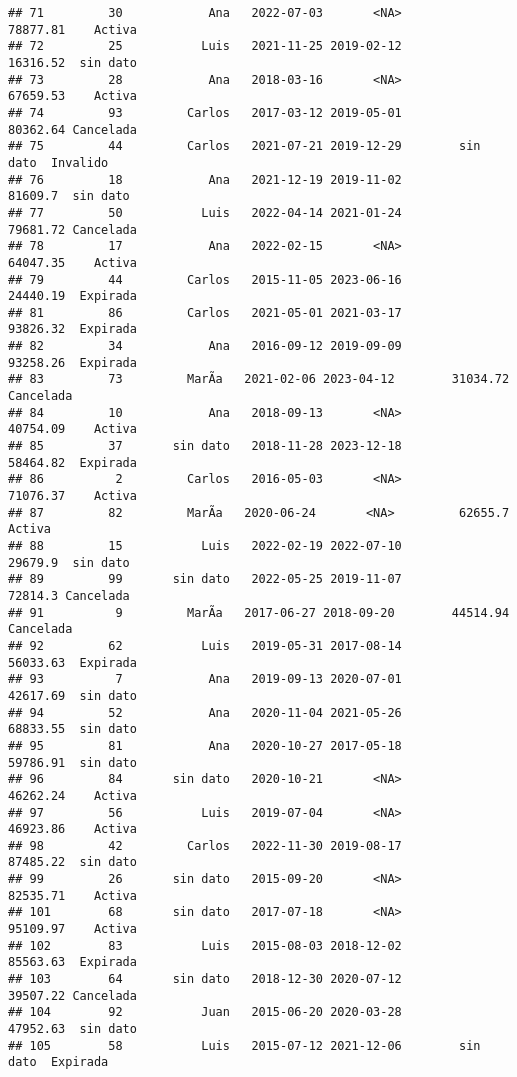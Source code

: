 \documentclass[
]{article}
\begin{document}
\begin{verbatim}
## 71         30            Ana   2022-07-03       <NA>        78877.81    Activa
## 72         25           Luis   2021-11-25 2019-02-12        16316.52  sin dato
## 73         28            Ana   2018-03-16       <NA>        67659.53    Activa
## 74         93         Carlos   2017-03-12 2019-05-01        80362.64 Cancelada
## 75         44         Carlos   2021-07-21 2019-12-29        sin dato  Invalido
## 76         18            Ana   2021-12-19 2019-11-02         81609.7  sin dato
## 77         50           Luis   2022-04-14 2021-01-24        79681.72 Cancelada
## 78         17            Ana   2022-02-15       <NA>        64047.35    Activa
## 79         44         Carlos   2015-11-05 2023-06-16        24440.19  Expirada
## 81         86         Carlos   2021-05-01 2021-03-17        93826.32  Expirada
## 82         34            Ana   2016-09-12 2019-09-09        93258.26  Expirada
## 83         73         MarÃ­a   2021-02-06 2023-04-12        31034.72 Cancelada
## 84         10            Ana   2018-09-13       <NA>        40754.09    Activa
## 85         37       sin dato   2018-11-28 2023-12-18        58464.82  Expirada
## 86          2         Carlos   2016-05-03       <NA>        71076.37    Activa
## 87         82         MarÃ­a   2020-06-24       <NA>         62655.7    Activa
## 88         15           Luis   2022-02-19 2022-07-10         29679.9  sin dato
## 89         99       sin dato   2022-05-25 2019-11-07         72814.3 Cancelada
## 91          9         MarÃ­a   2017-06-27 2018-09-20        44514.94 Cancelada
## 92         62           Luis   2019-05-31 2017-08-14        56033.63  Expirada
## 93          7            Ana   2019-09-13 2020-07-01        42617.69  sin dato
## 94         52            Ana   2020-11-04 2021-05-26        68833.55  sin dato
## 95         81            Ana   2020-10-27 2017-05-18        59786.91  sin dato
## 96         84       sin dato   2020-10-21       <NA>        46262.24    Activa
## 97         56           Luis   2019-07-04       <NA>        46923.86    Activa
## 98         42         Carlos   2022-11-30 2019-08-17        87485.22  sin dato
## 99         26       sin dato   2015-09-20       <NA>        82535.71    Activa
## 101        68       sin dato   2017-07-18       <NA>        95109.97    Activa
## 102        83           Luis   2015-08-03 2018-12-02        85563.63  Expirada
## 103        64       sin dato   2018-12-30 2020-07-12        39507.22 Cancelada
## 104        92           Juan   2015-06-20 2020-03-28        47952.63  sin dato
## 105        58           Luis   2015-07-12 2021-12-06        sin dato  Expirada

\end{verbatim}
\end{document}
